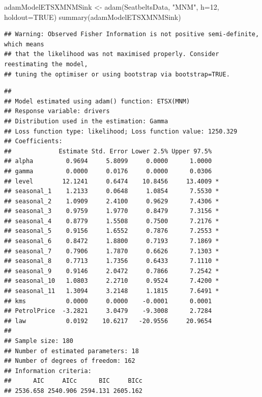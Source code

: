 \documentclass[
]{book}
\newenvironment{Shaded}{\begin{snugshade}}{\end{snugshade}}
\newcommand{\AttributeTok}[1]{\textcolor[rgb]{0.77,0.63,0.00}{#1}}
\newcommand{\ConstantTok}[1]{\textcolor[rgb]{0.00,0.00,0.00}{#1}}
\newcommand{\DecValTok}[1]{\textcolor[rgb]{0.00,0.00,0.81}{#1}}
\newcommand{\FunctionTok}[1]{\textcolor[rgb]{0.00,0.00,0.00}{#1}}
\newcommand{\NormalTok}[1]{#1}
\newcommand{\OtherTok}[1]{\textcolor[rgb]{0.56,0.35,0.01}{#1}}
\newcommand{\StringTok}[1]{\textcolor[rgb]{0.31,0.60,0.02}{#1}}
\theoremstyle{definition}
\theoremstyle{definition}
\theoremstyle{definition}
\theoremstyle{definition}
\theoremstyle{remark}
\begin{document}
\begin{Shaded}
\begin{Highlighting}[]
\NormalTok{adamModelETSXMNMSink }\OtherTok{\textless{}{-}} \FunctionTok{adam}\NormalTok{(SeatbeltsData, }\StringTok{"MNM"}\NormalTok{,}
                             \AttributeTok{h=}\DecValTok{12}\NormalTok{, }\AttributeTok{holdout=}\ConstantTok{TRUE}\NormalTok{)}
\FunctionTok{summary}\NormalTok{(adamModelETSXMNMSink)}
\end{Highlighting}
\end{Shaded}

\begin{verbatim}
## Warning: Observed Fisher Information is not positive semi-definite, which means
## that the likelihood was not maximised properly. Consider reestimating the model,
## tuning the optimiser or using bootstrap via bootstrap=TRUE.
\end{verbatim}

\begin{verbatim}
## 
## Model estimated using adam() function: ETSX(MNM)
## Response variable: drivers
## Distribution used in the estimation: Gamma
## Loss function type: likelihood; Loss function value: 1250.329
## Coefficients:
##             Estimate Std. Error Lower 2.5% Upper 97.5%  
## alpha         0.9694     5.8099     0.0000      1.0000  
## gamma         0.0000     0.0176     0.0000      0.0306  
## level        12.1241     0.6474    10.8456     13.4009 *
## seasonal_1    1.2133     0.0648     1.0854      7.5530 *
## seasonal_2    1.0909     2.4100     0.9629      7.4306 *
## seasonal_3    0.9759     1.9770     0.8479      7.3156 *
## seasonal_4    0.8779     1.5508     0.7500      7.2176 *
## seasonal_5    0.9156     1.6552     0.7876      7.2553 *
## seasonal_6    0.8472     1.8800     0.7193      7.1869 *
## seasonal_7    0.7906     1.7870     0.6626      7.1303 *
## seasonal_8    0.7713     1.7356     0.6433      7.1110 *
## seasonal_9    0.9146     2.0472     0.7866      7.2542 *
## seasonal_10   1.0803     2.2710     0.9524      7.4200 *
## seasonal_11   1.3094     3.2148     1.1815      7.6491 *
## kms           0.0000     0.0000    -0.0001      0.0001  
## PetrolPrice  -3.2821     3.0479    -9.3008      2.7284  
## law           0.0192    10.6217   -20.9556     20.9654  
## 
## Sample size: 180
## Number of estimated parameters: 18
## Number of degrees of freedom: 162
## Information criteria:
##      AIC     AICc      BIC     BICc 
## 2536.658 2540.906 2594.131 2605.162
\end{verbatim}
\end{document}
